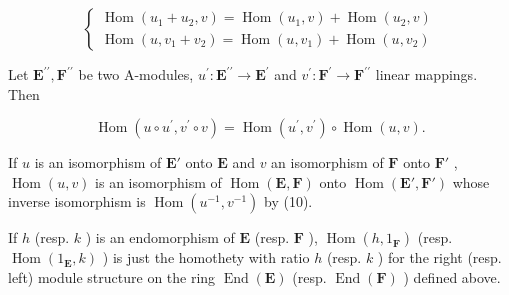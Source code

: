 \[
\left\{ \begin{array}{l} \operatorname{Hom} (u _ {1} + u _ {2}, v) = \operatorname{Hom} (u _ {1}, v) + \operatorname{Hom} (u _ {2}, v) \\ \operatorname{Hom} (u, v _ {1} + v _ {2}) = \operatorname{Hom} (u, v _ {1}) + \operatorname{Hom} (u, v _ {2}) \end{array} \right.\tag{9}
\]

Let \(\mathbf{E}^{\prime \prime},\mathbf{F}^{\prime \prime}\) be two A-modules, \(u^{\prime}:\mathbf{E}^{\prime \prime}\to \mathbf{E}^{\prime}\) and \(v^{\prime}:\mathbf{F}^{\prime}\rightarrow \mathbf{F}^{\prime \prime}\) linear mappings. Then

\[
\operatorname{Hom} \left(u \circ u ^ {\prime}, v ^ {\prime} \circ v\right) = \operatorname{Hom} \left(u ^ {\prime}, v ^ {\prime}\right) \circ \operatorname{Hom} (u, v).\tag{10}
\]

If \(u\) is an isomorphism of \(\mathbf{E}'\) onto \(\mathbf{E}\) and \(v\) an isomorphism of \(\mathbf{F}\) onto \(\mathbf{F}'\) , \(\operatorname{Hom}(u, v)\) is an isomorphism of \(\operatorname{Hom}(\mathbf{E}, \mathbf{F})\) onto \(\operatorname{Hom}(\mathbf{E}', \mathbf{F}')\) whose inverse isomorphism is \(\operatorname{Hom}(u^{-1}, v^{-1})\) by (10).

If \(h\) (resp. \(k\) ) is an endomorphism of \(\mathbf{E}\) (resp. \(\mathbf{F}\) ), \(\operatorname{Hom}(h, 1_{\mathbf{F}})\) (resp. \(\operatorname{Hom}(1_{\mathbf{E}}, k)\) ) is just the homothety with ratio \(h\) (resp. \(k\) ) for the right (resp. left) module structure on the ring \(\operatorname{End}(\mathbf{E})\) (resp. \(\operatorname{End}(\mathbf{F})\) ) defined above.


